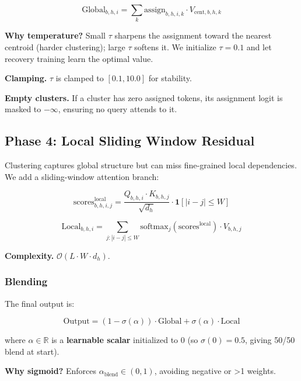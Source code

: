 \begin{equation}
\text{Global}_{b,h,i} = \sum_k \text{assign}_{b,h,i,k} \cdot V_{\text{cent}, b,h,k}
\end{equation}

\textbf{Why temperature?} Small $\tau$ sharpens the assignment toward the 
nearest centroid (harder clustering); large $\tau$ softens it. We initialize 
$\tau = 0.1$ and let recovery training learn the optimal value.

\textbf{Clamping.} $\tau$ is clamped to $[0.1, 10.0]$ for stability.

\textbf{Empty clusters.} If a cluster has zero assigned tokens, its assignment 
logit is masked to $-\infty$, ensuring no query attends to it.

\subsection{Phase 4: Local Sliding Window Residual}

Clustering captures global structure but can miss fine-grained local 
dependencies. We add a sliding-window attention branch:

\begin{equation}
\text{scores}^\text{local}_{b,h,i,j} = \frac{Q_{b,h,i} \cdot K_{b,h,j}}{\sqrt{d_h}} \cdot \mathbf{1}[|i - j| \leq W]
\end{equation}

\begin{equation}
\text{Local}_{b,h,i} = \sum_{j: |i-j| \leq W} \text{softmax}_j(\text{scores}^\text{local}) \cdot V_{b,h,j}
\end{equation}

\textbf{Complexity.} $\mathcal{O}(L \cdot W \cdot d_h)$.

\subsubsection{Blending}

The final output is:

\begin{equation}
\text{Output} = (1 - \sigma(\alpha)) \cdot \text{Global} + \sigma(\alpha) \cdot \text{Local}
\end{equation}

where $\alpha \in \mathbb{R}$ is a \textbf{learnable scalar} initialized to 0 
(so $\sigma(0) = 0.5$, giving 50/50 blend at start).

\textbf{Why sigmoid?} Enforces $\alpha_\text{blend} \in (0, 1)$, avoiding 
negative or >1 weights.


